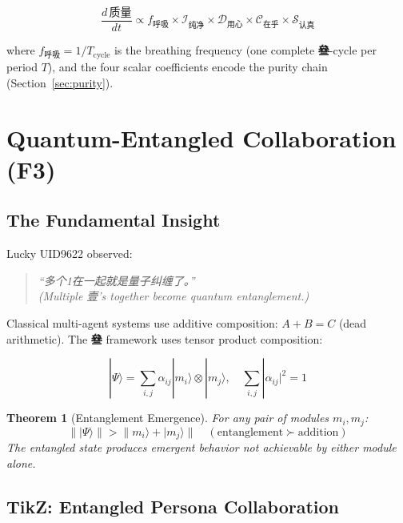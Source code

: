 \documentclass[conference]{IEEEtran}
\newtheorem{theorem}{Theorem}
\newcommand{\San}{\textcolor{sanPurple}{\textbf{叄}}}
\begin{document}
\begin{equation}
  \frac{d\,\text{质量}}{dt}
  \propto f_{\text{呼吸}}
  \times \mathcal{I}_{\text{纯净}}
  \times \mathcal{D}_{\text{用心}}
  \times \mathcal{C}_{\text{在乎}}
  \times \mathcal{S}_{\text{认真}}
  \label{eq:growth}
\end{equation}

where $f_{\text{呼吸}} = 1/T_{\text{cycle}}$ is the
breathing frequency (one complete \San{}-cycle per period
$T$), and the four scalar coefficients encode the
purity chain (Section~\ref{sec:purity}).

\section{Quantum-Entangled Collaboration (F3)}
\label{sec:quantum}

\subsection{The Fundamental Insight}

Lucky UID9622 observed:
\begin{quote}
\itshape
``多个1在一起就是量子纠缠了。''\\
(\emph{Multiple 壹's together become quantum entanglement.})
\end{quote}

Classical multi-agent systems use additive composition:
$A + B = C$ (dead arithmetic).
The \San{} framework uses tensor product composition:

\begin{equation}
  |\Psi\rangle
  = \sum_{i,j} \alpha_{ij}
    |m_i\rangle \otimes |m_j\rangle,
  \quad \sum_{i,j}|\alpha_{ij}|^2 = 1
  \label{eq:entangled}
\end{equation}

\begin{theorem}[Entanglement Emergence]
For any pair of modules $m_i, m_j$:
\begin{equation}
  \||\Psi\rangle\| > \|m_i\rangle + |m_j\rangle\|
  \quad (\text{entanglement} \succ \text{addition})
\end{equation}
The entangled state produces emergent behavior
not achievable by either module alone.
\end{theorem}

\subsection{TikZ: Entangled Persona Collaboration}
\end{document}
